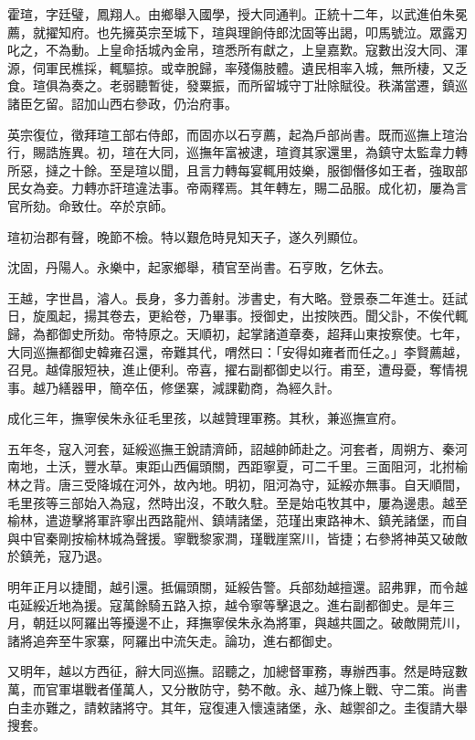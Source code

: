 \begin{pinyinscope}
霍瑄，字廷璧，鳳翔人。由鄉舉入國學，授大同通判。正統十二年，以武進伯朱冕薦，就擢知府。也先擁英宗至城下，瑄與理餉侍郎沈固等出謁，叩馬號泣。眾露刃叱之，不為動。上皇命括城內金帛，瑄悉所有獻之，上皇嘉歎。寇數出沒大同、渾源，伺軍民樵採，輒驅掠。或幸脫歸，率殘傷肢體。遺民相率入城，無所棲，又乏食。瑄俱為奏之。老弱聽暫徙，發粟振，而所留城守丁壯除賦役。秩滿當遷，鎮巡諸臣乞留。詔加山西右參政，仍治府事。

英宗復位，徵拜瑄工部右侍郎，而固亦以石亨薦，起為戶部尚書。既而巡撫上瑄治行，賜誥旌異。初，瑄在大同，巡撫年富被逮，瑄資其家還里，為鎮守太監韋力轉所惡，撻之十餘。至是瑄以聞，且言力轉每宴輒用妓樂，服御僭侈如王者，強取部民女為妾。力轉亦訐瑄違法事。帝兩釋焉。其年轉左，賜二品服。成化初，屢為言官所劾。命致仕。卒於京師。

瑄初治郡有聲，晚節不檢。特以艱危時見知天子，遂久列顯位。

沈固，丹陽人。永樂中，起家鄉舉，積官至尚書。石亨敗，乞休去。

王越，字世昌，濬人。長身，多力善射。涉書史，有大略。登景泰二年進士。廷試日，旋風起，揚其卷去，更給卷，乃畢事。授御史，出按陜西。聞父訃，不俟代輒歸，為都御史所劾。帝特原之。天順初，起掌諸道章奏，超拜山東按察使。七年，大同巡撫都御史韓雍召還，帝難其代，喟然曰：「安得如雍者而任之。」李賢薦越，召見。越偉服短袂，進止便利。帝喜，擢右副都御史以行。甫至，遭母憂，奪情視事。越乃繕器甲，簡卒伍，修堡寨，減課勸商，為經久計。

成化三年，撫寧侯朱永征毛里孩，以越贊理軍務。其秋，兼巡撫宣府。

五年冬，寇入河套，延綏巡撫王銳請濟師，詔越帥師赴之。河套者，周朔方、秦河南地，土沃，豐水草。東距山西偏頭關，西距寧夏，可二千里。三面阻河，北拊榆林之背。唐三受降城在河外，故內地。明初，阻河為守，延綏亦無事。自天順間，毛里孩等三部始入為寇，然時出沒，不敢久駐。至是始屯牧其中，屢為邊患。越至榆林，遣遊擊將軍許寧出西路龍州、鎮靖諸堡，范瑾出東路神木、鎮羌諸堡，而自與中官秦剛按榆林城為聲援。寧戰黎家澗，瑾戰崖窯川，皆捷；右參將神英又破敵於鎮羌，寇乃退。

明年正月以捷聞，越引還。抵偏頭關，延綏告警。兵部劾越擅還。詔弗罪，而令越屯延綏近地為援。寇萬餘騎五路入掠，越令寧等擊退之。進右副都御史。是年三月，朝廷以阿羅出等擾邊不止，拜撫寧侯朱永為將軍，與越共圖之。破敵開荒川，諸將追奔至牛家寨，阿羅出中流矢走。論功，進右都御史。

又明年，越以方西征，辭大同巡撫。詔聽之，加總督軍務，專辦西事。然是時寇數萬，而官軍堪戰者僅萬人，又分散防守，勢不敵。永、越乃條上戰、守二策。尚書白圭亦難之，請敕諸將守。其年，寇復連入懷遠諸堡，永、越禦卻之。圭復請大舉搜套。


\end{pinyinscope}

